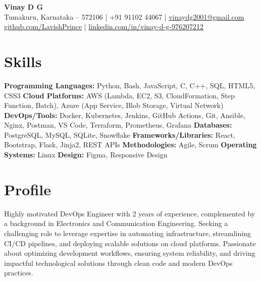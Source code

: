 \documentclass[a4paper,10pt]{article}
\begin{document}
\textbf{\Large Vinay D G} \\Tumakuru, Karnataka – 572106 \quad | \quad +91 91102 44067 \quad | \quad \href{mailto:vinaydg2001@gmail.com}{vinaydg2001@gmail.com} \\\href{https://github.com/LavishPrince}{github.com/LavishPrince} \quad | \quad \href{https://www.linkedin.com/in/vinay-d-g-976207212/}{linkedin.com/in/vinay-d-g-976207212}

\section*{Skills}
\textbf{Programming Languages:} Python, Bash, JavaScript, C, C++, SQL, HTML5, CSS3
\textbf{Cloud Platforms:} AWS (Lambda, EC2, S3, CloudFormation, Step Function, Batch), Azure (App Service, Blob Storage, Virtual Network)
\textbf{DevOps/Tools:} Docker, Kubernetes, Jenkins, GitHub Actions, Git, Ansible, Nginx, Postman, VS Code, Terraform, Prometheus, Grafana
\textbf{Databases:} PostgreSQL, MySQL, SQLite, Snowflake
\textbf{Frameworks/Libraries:} React, Bootstrap, Flask, Jinja2, REST APIs
\textbf{Methodologies:} Agile, Scrum
\textbf{Operating Systems:} Linux
\textbf{Design:} Figma, Responsive Design

\section*{Profile}
Highly motivated DevOps Engineer with 2 years of experience, complemented by a background in Electronics and Communication Engineering. Seeking a challenging role to leverage expertise in automating infrastructure, streamlining CI/CD pipelines, and deploying scalable solutions on cloud platforms. Passionate about optimizing development workflows, ensuring system reliability, and driving impactful technological solutions through clean code and modern DevOps practices.

\end{document}
